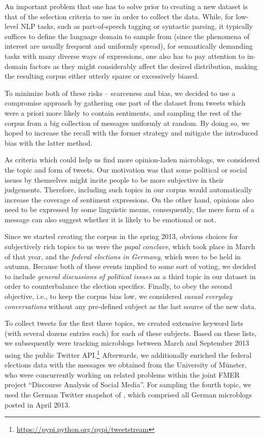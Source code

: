 An important problem that one has to solve prior to creating a new
dataset is that of the selection criteria to use in order to collect
the data.  While, for low-level NLP tasks, such as part-of-speech
tagging or syntactic parsing, it typically suffices to define the
language domain to sample from (since the phenomena of interest are
usually frequent and uniformly spread), for semantically demanding
tasks with many diverse ways of expressions, one also has to pay
attention to in-domain factors as they might considerably affect the
desired distribution, making the resulting corpus either utterly
sparse or excessively biased.

To minimize both of these risks -- scarceness and bias, we decided to
use a compromise approach by gathering one part of the dataset from
tweets which were a priori more likely to contain sentiments, and
sampling the rest of the corpus from a big collection of messages
uniformly at random.  By doing so, we hoped to increase the recall
with the former strategy and mitigate the introduced bias with the
latter method.

As criteria which could help us find more opinion-laden microblogs, we
considered the topic and form of tweets.  Our motivation was that some
political or social issues by themselves might incite people to be
more subjective in their judgements.  Therefore, including such topics
in our corpus would automatically increase the coverage of sentiment
expressions.  On the other hand, opinions also need to be expressed by
some linguistic means, consequently, the mere form of a message can
also suggest whether it is likely to be emotional or not.

Since we started creating the corpus in the spring 2013, obvious
choices for subjectively rich topics to us were the \emph{papal
  conclave}, which took place in March of that year, and the
\emph{federal elections in Germany}, which were to be held in autumn.
Because both of these events implied to some sort of voting, we
decided to include \emph{general discussions of political issues} as a
third topic in our dataset in order to counterbalance the election
specifics.  Finally, to obey the second objective, i.e., to keep the
corpus bias low, we considered \emph{casual everyday conversations}
without any pre-defined subject as the last source of the new data.

To collect tweets for the first three topics, we created extensive
keyword lists (with several dozens entries each) for each of these
subjects.  Based on these lists, we subsequently were tracking
microblogs between March and September 2013 using the public Twitter
API.\footnote{\url{https://pypi.python.org/pypi/tweetstream}}
Afterwards, we additionally enriched the federal elections data with
the messages we obtained from the University of M\"unster, who were
concurrently working on related problems within the joint FMER project
``Discourse Analysis of Social Media''.  For sampling the fourth
topic, we used the German Twitter snapshot of \citet{Scheffler:14},
which comprised all German microblogs posted in April 2013.

